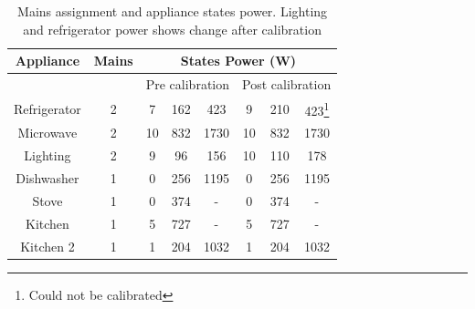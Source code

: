 \documentclass[conference]{IEEEtran}
\begin{document}

\begin{table}
\caption{Mains assignment and appliance states power. Lighting and refrigerator power shows change after calibration}
\vspace{-8pt}
\label{tab:calibration_factors}
\begin{tabular}{|c|c|c|c|c|c|c|c|}
\hline
Appliance & Mains & \multicolumn{6}{|c|}{States Power (W)}\\
\hline
&&\multicolumn{3}{|c|}{Pre calibration}&\multicolumn{3}{|c|}{Post calibration}\\
\hline
Refrigerator & 2& 7&162&423 & 9&210&423\footnote{Could not be calibrated}\\
Microwave &2& 10&832&1730& 10&832&1730\\
Lighting & 2& 9&96&156&10&110&178\\
Dishwasher & 1& 0&256& 1195 & 0&256& 1195\\
Stove& 1 & 0&374&-& 0&374&-\\
Kitchen & 1& 5&727&-&5&727&-\\
Kitchen 2&1 & 1&204&1032&1&204&1032 \\
%
%
\hline
%
\end{tabular}
\end{table}
\end{document}
